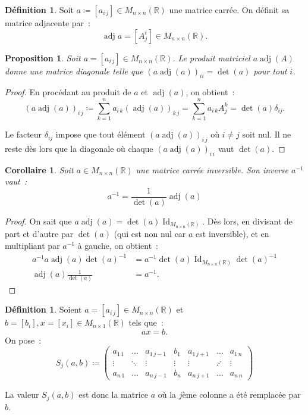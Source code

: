 \documentclass{article}
\DeclareMathOperator{\Id}{Id}
\DeclareMathOperator{\adj}{adj}
\newcommand{\R}{\mathbb R}
\newcommand{\M}[3]{M_{#1 \times #2}(#3)}
\newtheorem{prp}[thm]{Proposition}
\newtheorem{cor}[thm]{Corollaire}
\theoremstyle{definition}
\newtheorem{déf}[thm]{Définition}
\theoremstyle{remark}
\begin{document}
		\begin{déf} Soit $a \coloneqq [a_{i\,j}] \in \M nn\R$ une matrice carrée. On définit sa matrice adjacente par~: \[\adj a = [A_j^i] \in \M nn\R.\] \end{déf}

		\begin{prp} Soit $a = [a_{i\,j}] \in \M nn\R$. Le produit matriciel $a \adj(A)$ donne une matrice diagonale telle que $(a \adj(a))_{ii} = \det(a)$ pour tout $i$.
		\end{prp}

		\begin{proof} En procédant au produit de $a$ et $\adj(a)$, on obtient~:
		\[(a\adj(a))_{i\,j} \coloneqq \sum_{k=1}^na_{i\,k}(\adj(a))_{k\,j} = \sum_{k=1}^na_{i\,k}A_j^k = \det(a)\delta_{ij}.\]

		Le facteur $\delta_{ij}$ impose que tout élément $(a\adj(a))_{i\,j}$ où $i \neq j$ soit nul. Il ne reste dès lors que la diagonale où chaque $(a\adj(a))_{i\,i}$
		vaut $\det(a)$. \end{proof}

		\begin{cor} Soit $a \in \M nn\R$ une matrice carrée inversible. Son inverse $a^{-1}$ vaut~:
		\[a^{-1} = \frac 1{\det(a)}\adj(a)\] \end{cor}

		\begin{proof} On sait que $a\adj(a) = \det(a)\Id_{\M nn\R}$. Dès lors, en divisant de part et d'autre par $\det(a)$ (qui est non nul car $a$ est inversible),
		et en multipliant par $a^{-1}$ à gauche, on obtient~:
		\[\begin{aligned}
			a^{-1}a\adj(a)\det(a)^{-1} &= a^{-1}\det(a)\Id_{\M nn\R}\det(a)^{-1} \\
			\adj(a)\frac 1{\det(a)} &= a^{-1}.
		\end{aligned}\]
		\end{proof}

		\begin{déf} Soient $a = [a_{i\,j}] \in \M nn\R$ et $b = [b_i], x = [x_i] \in \M n1\R$ tels que~: \[ax = b.\] On pose~:
		\[S_j(a, b) \coloneqq
		\begin{pmatrix}
			a_{1\,1} & \ldots & a_{1\,j-1} &   b_1  & a_{1\,j+1} & \ldots  & a_{1\,n} \\
			  \vdots & \ddots &   \vdots   & \vdots &   \vdots   & \iddots &   \vdots \\
			a_{n\,1} & \ldots & a_{n\,j-1} &   b_n  & a_{n\,j+1} & \ldots  & a_{n\,n}
		\end{pmatrix}
		\]

		La valeur $S_j(a, b)$ est donc la matrice $a$ où la $j$ème colonne a été remplacée par $b$. \end{déf}
\end{document}
